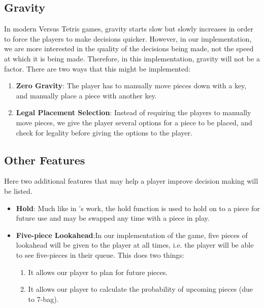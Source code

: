 \documentclass[a4paper, 12pt]{extreport}
\begin{document}
			\subsection{Gravity}
			
				In modern Versus Tetris games, gravity starts slow but slowly increases in order to force the players to make decisions quicker. However, in our implementation, we are more interested in the quality of the decisions being made, not the speed at which it is being made. Therefore, in this implementation, gravity will not be a factor. There are two ways that this might be implemented:
				
				\begin{enumerate}
					\item \textbf{Zero Gravity}: The player has to manually move pieces down with a key, and manually place a piece with another key.
					\item \textbf{Legal Placement Selection}: Instead of requiring the players to manually move pieces, we give the player several options for a piece to be placed, and check for legality before giving the options to the player.
				\end{enumerate}
			
			\subsection{Other Features}
			
				Here two additional features that may help a player improve decision making will be listed.
				
				\begin{itemize}
					\item \textbf{Hold}: Much like in \citeauthor{tetris-drl-2}'s \cite{tetris-drl-2} work, the hold function is used to hold on to a piece for future use and may be swapped any time with a piece in play.
					\item \textbf{Five-piece Lookahead}:In our implementation of the game, five pieces of lookahead will be given to the player at all times, i.e. the player will be able to see five-pieces in their queue. This does two things:
					\begin{enumerate}
						\item It allows our player to plan for future pieces.
						\item It allows our player to calculate the probability of upcoming pieces (due to 7-bag).
					\end{enumerate}
				\end{itemize}
		
\end{document}
